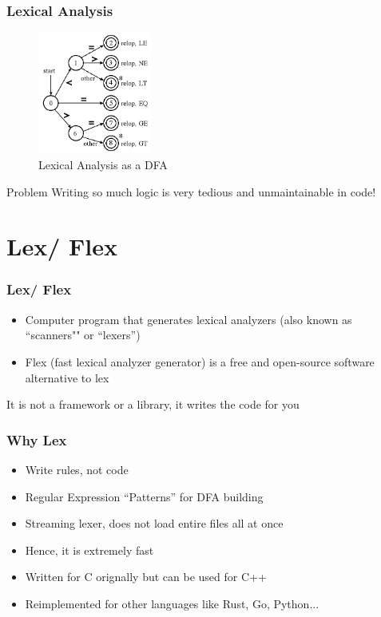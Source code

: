 \documentclass{beamer}
\begin{document}
\begin{frame}
    \frametitle{Lexical Analysis}

    \begin{figure}
        \centering
        \includegraphics[height=4cm]{./imgs/dfa.jpg}
        \caption{Lexical Analysis as a DFA}
        \label{fig:dfa}
    \end{figure}

    \begin{block}{Problem}
        Writing so much logic is very tedious and unmaintainable in code!
    \end{block}
\end{frame}

\section{Lex/ Flex}

\begin{frame}
    \frametitle{Lex/ Flex}

    \begin{itemize}
        \item Computer program that generates lexical analyzers (also known as ``scanners"" or ``lexers'')
        \item Flex (fast lexical analyzer generator) is a free and open-source software alternative to lex
    \end{itemize}

    It is not a framework or a library, it writes the code for you
\end{frame}

\begin{frame}
    \frametitle{Why Lex}

    \begin{itemize}
        \item Write rules, not code
        \item Regular Expression ``Patterns'' for DFA building
        \item Streaming lexer, does not load entire files all at once
        \item Hence, it is extremely fast
        \item Written for C orignally but can be used for C++
        \item Reimplemented for other languages like Rust, Go, Python...
    \end{itemize}
\end{frame}
\end{document}
